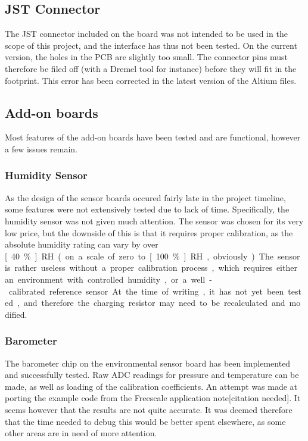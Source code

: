 \subsection{JST Connector}
The JST connector included on the board was not intended to be used in the scope
of this project, and the interface has thus not been tested. On the current
version, the holes in the PCB are slightly too small. The connector pins must
therefore be filed off (with a Dremel tool for instance) before they will fit in
the footprint. This error has been corrected in the latest version of the Altium
files. %

\subsection{Add-on boards}
Most features of the add-on boards have been tested and are functional, however
a few issues remain.

\subsubsection{Humidity Sensor}
\label{sub2:humidity}
As the design of the sensor boards occured fairly late in the project timeline,
some features were not extensively tested due to lack of time. Specifically, the
humidity sensor was not given much attention. The sensor was chosen for its very
low price, but the downside of this is that it requires proper calibration, as
the absolute humidity rating can vary by over \unit[40\%]{RH} (on a scale of
zero to \unit[100\%]{RH}, obviously). The sensor is rather useless without a
proper calibration process, which requires either an environment with controlled
humidity, or a well-calibrated reference sensor. At the time of writing, it has
not yet been tested, and therefore the charging resistor may need to be
recalculated and modified.

\subsubsection{Barometer}
\label{sub2:barometer}
The barometer chip on the environmental sensor board has been implemented and
successfully tested. Raw ADC readings for pressure and temperature can be made,
as well as loading of the calibration coefficients. An attempt was made
at porting the example code from the Freescale application note[citation
needed].
It seems however that the results are not quite accurate. It was deemed
therefore that the time needed to debug this would be better spent elsewhere, as
some other areas are in need of more attention.


